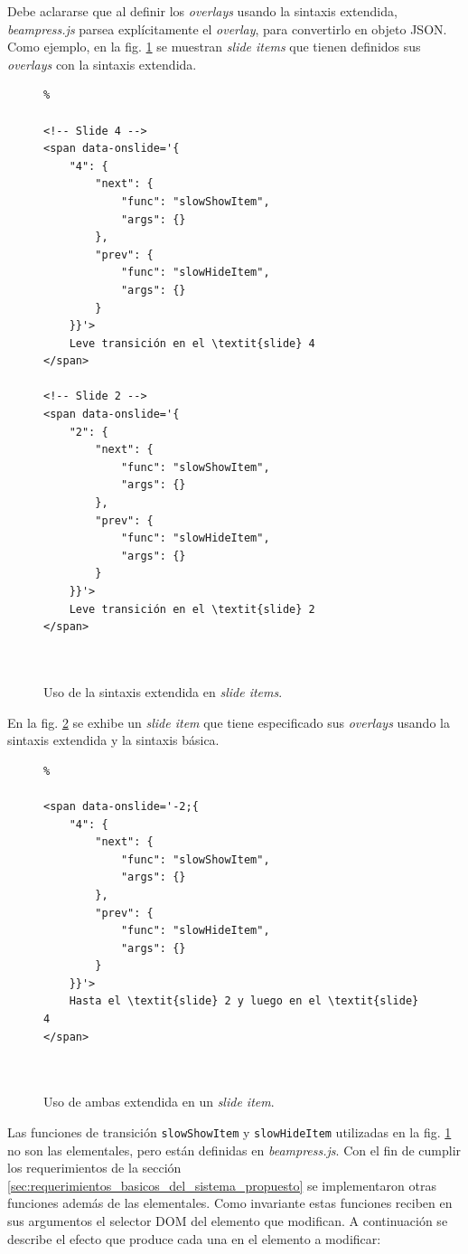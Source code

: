 			Debe aclararse que al definir los \textit{overlays} usando la sintaxis extendida, \textit{beampress.js} parsea explícitamente el \textit{overlay}, para convertirlo en objeto JSON. Como ejemplo, en la fig. \ref{fig:extended_syntax_html} se muestran \textit{slide items} que tienen definidos sus \textit{overlays} con la sintaxis extendida.

			\begin{figure}[htb]%
				\begin{lstlisting}%

<!-- Slide 4 -->
<span data-onslide='{
    "4": {
        "next": {
            "func": "slowShowItem",
            "args": {}
        },
        "prev": {
            "func": "slowHideItem",
            "args": {}
        }
    }}'>
	Leve transición en el \textit{slide} 4
</span>

<!-- Slide 2 -->
<span data-onslide='{
    "2": {
        "next": {
            "func": "slowShowItem",
            "args": {}
        },
        "prev": {
            "func": "slowHideItem",
            "args": {}
        }
    }}'>
	Leve transición en el \textit{slide} 2
</span>

			
				\end{lstlisting}
				\caption{Uso de la sintaxis extendida en \textit{slide items}.} 
				\label{fig:extended_syntax_html}
			\end{figure}

			En la fig. \ref{fig:basic_and_extended_syntax_html} se exhibe un \textit{slide item} que tiene especificado sus \textit{overlays} usando la sintaxis extendida y la sintaxis básica.


			\begin{figure}[htb]%
				\begin{lstlisting}%

<span data-onslide='-2;{
    "4": {
        "next": {
            "func": "slowShowItem",
            "args": {}
        },
        "prev": {
            "func": "slowHideItem",
            "args": {}
        }
    }}'>
	Hasta el \textit{slide} 2 y luego en el \textit{slide} 4
</span>

			
				\end{lstlisting}
				\caption{Uso de ambas extendida en un \textit{slide item}.} 
				\label{fig:basic_and_extended_syntax_html}
			\end{figure}			


			Las funciones de transición \texttt{slowShowItem} y \texttt{slowHideItem} utilizadas en la fig. \ref{fig:extended_syntax_html} no son las elementales, pero están definidas en \textit{beampress.js}. Con el fin de cumplir los requerimientos de la sección \ref{sec:requerimientos_basicos_del_sistema_propuesto} se implementaron otras funciones además de las elementales. Como invariante estas funciones reciben en sus argumentos el selector DOM del elemento que modifican. A continuación se describe el efecto que produce cada una en el elemento a modificar:

